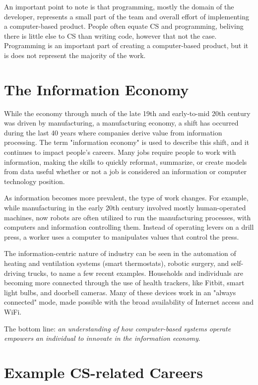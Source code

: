 An important point to note is that programming, mostly the domain of the developer, represents a small part of the team and overall effort of implementing a computer-based product. People often equate CS and programming, beliving there is little else to CS than writing code, however that not the case. Programming is an important part of creating a computer-based product, but it is does not represent the majority of the work.

\section{The Information Economy}

While the economy through much of the late 19th and early-to-mid 20th century was driven by manufacturing, a manufacturing economy, a shift has occurred during the last 40 years where companies derive value from information processing. The term "information economy" is used to describe this shift, and it continues to impact people's careers. Many jobs require people to work with information, making the skills to quickly reformat, summarize, or create models from data useful whether or not a job is considered an information or computer technology position.

As information becomes more prevalent, the type of work changes. For example, while manufacturing in the early 20th century involved mostly human-operated machines, now robots are often utilized to run the manufacturing processes, with computers and information controlling them. Instead of operating levers on a drill press, a worker uses a computer to manipulates values that control the press.

The information-centric nature of industry can be seen in the automation of heating and ventilation systems (smart thermostats), robotic surgery, and self-driving trucks, to name a few recent examples. Households and individuals are becoming more connected through the use of health trackers, like Fitbit, smart light bulbs, and doorbell cameras. Many of these devices work in an "always connected" mode, made possible with the broad availability of Internet access and WiFi.

The bottom line: \emph{an understanding of how computer-based systems operate empowers an individual to innovate in the information economy}.  

\newpage

\section{Example CS-related Careers}

